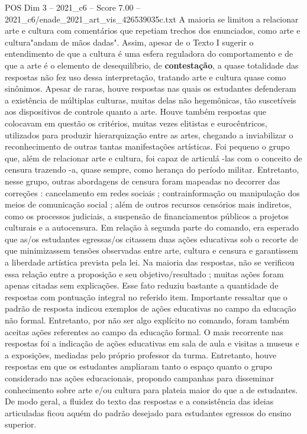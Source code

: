 \begin{textsample}{POS Dim 3 – 2021\_c6 – Score 7.00 – 2021\_c6/enade\_2021\_art\_vis\_426539035c.txt}
A maioria se limitou a relacionar arte e cultura com comentários que repetiam trechos dos enunciados, como arte e cultura"andam de mãos dadas".
Assim, apesar de o Texto I sugerir o entendimento de que a cultura é uma esfera reguladora do comportamento e de que a arte é o elemento de desequilíbrio, de \textbf{contestação}, a quase totalidade das respostas não fez uso dessa interpretação, tratando arte e cultura quase como sinônimos.
Apesar de raras, houve respostas nas quais os estudantes defenderam a existência de múltiplas culturas, muitas delas não hegemônicas, tão suscetíveis aos dispositivos de controle quanto a arte.
Houve também respostas que colocavam em questão os critérios, muitas vezes elitistas e eurocêntricos, utilizados para produzir hierarquização entre as artes, chegando a inviabilizar o reconhecimento de outras tantas manifestações artísticas.
Foi pequeno o grupo que, além de relacionar arte e cultura, foi capaz de articulá -las com o conceito de censura trazendo -a, quase sempre, como herança do período militar.
Entretanto, nesse grupo, outras abordagens de censura foram mapeadas no decorrer das correções : cancelamento em redes sociais ; contrainformação ou manipulação dos meios de comunicação social ; além de outros recursos censórios mais indiretos, como os processos judiciais, a suspensão de financiamentos públicos a projetos culturais e a autocensura.
Em relação à segunda parte do comando, era esperado que as/os estudantes egressas/os citassem duas ações educativas sob o recorte de que minimizassem tensões observadas entre arte, cultura e censura e garantissem a liberdade artística prevista pela lei.
Na maioria das respostas, não se verificou essa relação entre a proposição e seu objetivo/resultado ; muitas ações foram apenas citadas sem explicações.
Esse fato reduziu bastante a quantidade de respostas com pontuação integral no referido item.
Importante ressaltar que o padrão de resposta indicou exemplos de ações educativas no campo da educação não formal.
Entretanto, por não ser algo explícito no comando, foram também aceitas ações referentes ao campo da educação formal.
O mais recorrente nas respostas foi a indicação de ações educativas em sala de aula e visitas a museus e a exposições, mediadas pelo próprio professor da turma.
Entretanto, houve respostas em que os estudantes ampliaram tanto o espaço quanto o grupo considerado nas ações educacionais, propondo campanhas para disseminar conhecimento sobre arte e/ou cultura para plateia maior do que a de estudantes.
De modo geral, a fluidez do texto das respostas e a consistência das ideias articuladas ficou aquém do padrão desejado para estudantes egressos do ensino superior.

\end{textsample}
